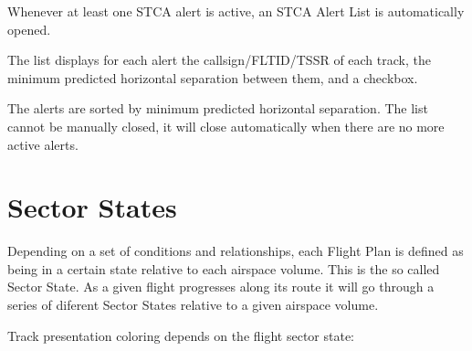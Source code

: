 \documentclass[a4paper,oneside,11pt]{memoir}
\begin{document}
\bigskip

Whenever at least one STCA alert is active, an STCA Alert List is automatically opened.


The list displays for each alert the callsign/FLTID/TSSR of each track, the minimum predicted horizontal separation between them, and a checkbox.

\bigskip

The alerts are sorted by minimum predicted horizontal separation. The list cannot be manually closed, it will close automatically when there are no more active alerts.

\section{Sector States}

Depending on a set of conditions and relationships, each Flight Plan is defined as being in a certain state relative to each airspace volume. This is the so called Sector State. As a given flight progresses along its route it will go through a series of diferent Sector States relative to a given airspace volume. 

\bigskip

Track presentation coloring depends on the flight sector state:
\end{document}
